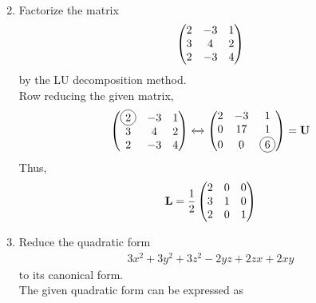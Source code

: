 \documentclass[journal,12pt,twocolumn]{IEEEtran}
\renewcommand\thesection{\arabic{section}}
\begin{document}
\begin{enumerate}[label=\thesection.\arabic*.,ref=\thesection.\theenumi]
\begin{align}
\end{align}
\item Factorize the matrix 
\begin{align}
		\begin{pmatrix}2 & -3 & 1\\3 & 4 & 2 \\ 2 & -3 & 4\end{pmatrix}
\end{align}
by the LU decomposition method.
\\
\solution 
Row reducing the given matrix, 
\begin{align}
		\myvec{\circled{2} & -3 & 1\\3 & 4 & 2 \\ 2 & -3 & 4}
	\xleftrightarrow[]{}
		\myvec{2 & -3 & 1\\ 0 & 17 & 1 \\ 0 & 0 & \circled{6}} = \vec{U}
\end{align}
Thus, 
\begin{align}
		\mathbf{L} = \frac{1}{2}\begin{pmatrix}2 & 0 & 0 \\ 3 & 1 & 0 \\ 2 & 0 & 1\end{pmatrix} 
\end{align}
	\item Reduce the quadratic form 
\begin{align}
	3x^2+3y^2+3z^2-2yz+2zx+2xy
\end{align}
to its canonical form.
\\
\solution 
The given quadratic form can be expressed as 


\end{enumerate}
\end{document}
